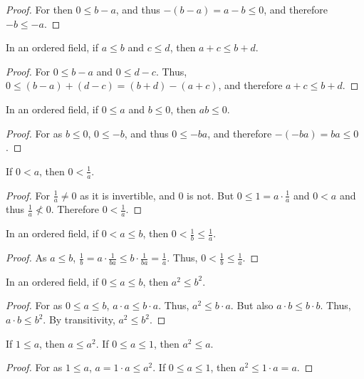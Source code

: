 \documentclass[crop=false,class=article,oneside]{standalone}
\begin{document}
            \begin{proof}
            For then $0 \leq b-a$, and thus $-(b-a)=a-b\leq 0$, and therefore $-b \leq -a$.
            \end{proof}
            \begin{theorem}
            In an ordered field, if $a\leq b$ and $c\leq d$, then $a+c \leq b+d$.
            \end{theorem}
            \begin{proof}
            For $0\leq b-a$ and $0\leq d-c$. Thus, $0\leq (b-a)+(d-c)= (b+d)-(a+c)$, and therefore $a+c \leq b+d$.
            \end{proof}
            \begin{theorem}
            In an ordered field, if $0\leq a$ and $b\leq 0$, then $ab\leq 0$.
            \end{theorem}
            \begin{proof}
            For as $b\leq 0$, $0\leq -b$, and thus $0\leq -ba$, and therefore $-(-ba) = ba \leq 0$.
            \end{proof}
            \begin{theorem}
            If $0< a$, then $0<\frac{1}{a}$.
            \end{theorem}
            \begin{proof}
            For $\frac{1}{a}\ne 0$ as it is invertible, and $0$ is not. But $0\leq1=a\cdot \frac{1}{a}$ and $0<a$ and thus $\frac{1}{a} \not <0$. Therefore $0<\frac{1}{a}$.
            \end{proof}
            \begin{theorem}
            In an ordered field, if $0<a\leq b$, then $0<\frac{1}{b}\leq\frac{1}{a}$.
            \end{theorem}
            \begin{proof}
            As $a\leq b$, $\frac{1}{b}=a\cdot \frac{1}{ba} \leq b\cdot \frac{1}{ba}=\frac{1}{a}$. Thus, $0< \frac{1}{b}\leq \frac{1}{a}$.
            \end{proof}
            \begin{theorem}
            In an ordered field, if $0 \leq a \leq b$, then $a^2 \leq b^2$.
            \end{theorem}
            \begin{proof}
            For as $0\leq a \leq b$, $a\cdot a \leq b\cdot a$. Thus, $a^2 \leq b \cdot a$. But also $a\cdot b \leq b\cdot b$. Thus, $a\cdot b \leq b^2$. By transitivity, $a^2 \leq b^2$.
            \end{proof}
            \begin{corollary}
            If $1\leq a$, then $a \leq a^2$. If $0\leq a \leq 1$, then $a^2 \leq a$.
            \end{corollary}
            \begin{proof}
            For as $1\leq a$, $a=1\cdot a \leq a^2$. If $0\leq a \leq 1$, then $a^2 \leq 1\cdot a = a$.
            \end{proof}
\end{document}
